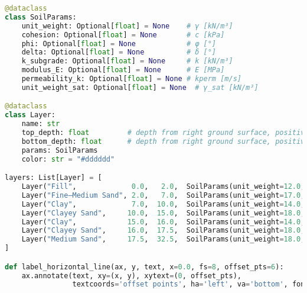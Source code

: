 \begin{lstlisting}[language=Python]
@dataclass
class SoilParams:
    unit_weight: Optional[float] = None    # γ [kN/m³]
    cohesion: Optional[float] = None       # c [kPa]
    phi: Optional[float] = None            # φ [°]
    delta: Optional[float] = None          # δ [°]
    k_subgrade: Optional[float] = None     # k [kN/m³]
    modulus_E: Optional[float] = None      # E [MPa]
    permeability_k: Optional[float] = None # kperm [m/s]
    unit_weight_sat: Optional[float] = None  # γ_sat [kN/m³]

@dataclass
class Layer:
    name: str
    top_depth: float         # depth from right ground surface, positive downward [m]
    bottom_depth: float      # depth from right ground surface, positive downward [m]
    params: SoilParams
    color: str = "#dddddd"

layers: List[Layer] = [
    Layer("Fill",             0.0,   2.0,  SoilParams(unit_weight=12.0, cohesion=20, phi=15.0, unit_weight_sat=12.0)),
    Layer("Fine–Medium Sand", 2.0,   7.0,  SoilParams(unit_weight=17.0, cohesion=0,  phi=30,   unit_weight_sat=19.0)),
    Layer("Clay",             7.0,  10.0,  SoilParams(unit_weight=14.0, cohesion=25, phi=17.5, unit_weight_sat=14.0)),
    Layer("Clayey Sand",     10.0,  15.0,  SoilParams(unit_weight=18.0, cohesion=0,  phi=25,   unit_weight_sat=20.0)),
    Layer("Clay",            15.0,  16.0,  SoilParams(unit_weight=14.0, cohesion=25, phi=17.5, unit_weight_sat=14.0)),
    Layer("Clayey Sand",     16.0,  17.5,  SoilParams(unit_weight=18.0, cohesion=0,  phi=25,   unit_weight_sat=20.0)),
    Layer("Medium Sand",     17.5,  32.5,  SoilParams(unit_weight=18.0, cohesion=0,  phi=32.5, unit_weight_sat=20.0)),
]

def label_horizontal_line(ax, y, text, x=0.0, fs=8, offset_pts=6):
    ax.annotate(text, xy=(x, y), xytext=(0, offset_pts),
                textcoords='offset points', ha='left', va='bottom', fontsize=fs, color='black')


\end{lstlisting}
